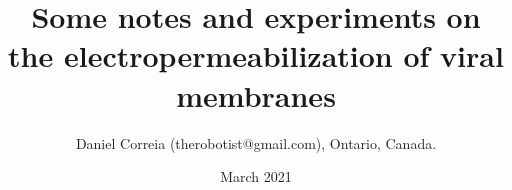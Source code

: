 \documentclass[paper.tex]{subfiles}
\begin{document}




\title{Some notes and experiments on the electropermeabilization of viral membranes}
\author{\small{Daniel Correia (therobotist@gmail.com), Ontario, Canada.}}
\date{March 2021}


\flushbottom 
\maketitle
\thispagestyle{empty}

\renewcommand{\abstractname}{Summary}    %
\end{document}
